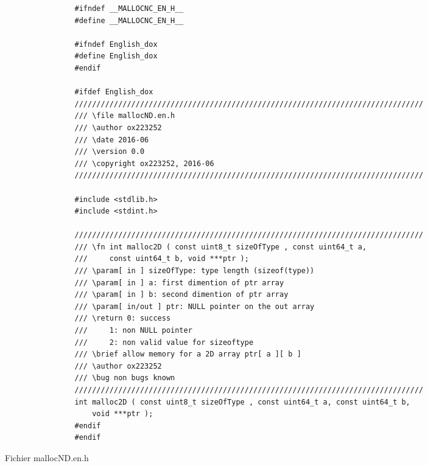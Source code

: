 		\begin{figure}[H]
			\begin{changemargin}{-2.5cm}{-2.5cm}
			\begin{tcolorbox}
			\begin{verbatim}
				#ifndef __MALLOCNC_EN_H__
				#define __MALLOCNC_EN_H__

				#ifndef English_dox
				#define English_dox
				#endif

				#ifdef English_dox
				////////////////////////////////////////////////////////////////////////////////
				/// \file mallocND.en.h
				/// \author ox223252
				/// \date 2016-06
				/// \version 0.0
				/// \copyright ox223252, 2016-06
				////////////////////////////////////////////////////////////////////////////////

				#include <stdlib.h>
				#include <stdint.h>

				////////////////////////////////////////////////////////////////////////////////
				/// \fn int malloc2D ( const uint8_t sizeOfType , const uint64_t a,
				/// 	const uint64_t b, void ***ptr );
				/// \param[ in ] sizeOfType: type length (sizeof(type))
				/// \param[ in ] a: first dimention of ptr array
				/// \param[ in ] b: second dimention of ptr array
				/// \param[ in/out ] ptr: NULL pointer on the out array
				/// \return 0: success
				/// 	1: non NULL pointer
				/// 	2: non valid value for sizeoftype
				/// \brief allow memory for a 2D array ptr[ a ][ b ]
				/// \author ox223252
				/// \bug non bugs known
				////////////////////////////////////////////////////////////////////////////////
				int malloc2D ( const uint8_t sizeOfType , const uint64_t a, const uint64_t b, 
				    void ***ptr );
				#endif
				#endif
			\end{verbatim}
			\end{tcolorbox}
			\end{changemargin}
			\caption{Fichier mallocND.en.h}
		\end{figure}
					
